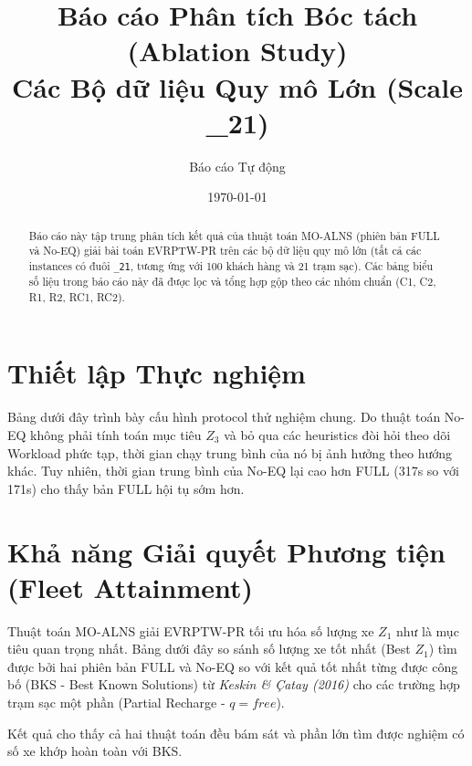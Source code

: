 \documentclass[12pt,a4paper]{article}
\title{Báo cáo Phân tích Bóc tách (Ablation Study)\\ Các Bộ dữ liệu Quy mô Lớn (Scale \_21)}
\author{Báo cáo Tự động}
\date{\today}
\begin{document}
\maketitle


\begin{abstract}
Báo cáo này tập trung phân tích kết quả của thuật toán MO-ALNS (phiên bản FULL và No-EQ) giải bài toán EVRPTW-PR trên các bộ dữ liệu quy mô lớn (tất cả các instances có đuôi \texttt{\_21}, tương ứng với 100 khách hàng và 21 trạm sạc). Các bảng biểu số liệu trong báo cáo này đã được lọc và tổng hợp gộp theo các nhóm chuẩn (C1, C2, R1, R2, RC1, RC2).
\end{abstract}

\section{Thiết lập Thực nghiệm}
Bảng dưới đây trình bày cấu hình protocol thử nghiệm chung. Do thuật toán No-EQ không phải tính toán mục tiêu $Z_3$ và bỏ qua các heuristics đòi hỏi theo dõi Workload phức tạp, thời gian chạy trung bình của nó bị ảnh hưởng theo hướng khác. Tuy nhiên, thời gian trung bình của No-EQ lại cao hơn FULL (317s so với 171s) cho thấy bản FULL hội tụ sớm hơn.

\begin{table}[H]
    \centering
    \caption{Protocol Thử nghiệm Tổng quan}
    
\end{table}

\section{Khả năng Giải quyết Phương tiện (Fleet Attainment)}
Thuật toán MO-ALNS giải EVRPTW-PR tối ưu hóa số lượng xe $Z_1$ như là mục tiêu quan trọng nhất. Bảng dưới đây so sánh số lượng xe tốt nhất (Best $Z_1$) tìm được bởi hai phiên bản FULL và No-EQ so với kết quả tốt nhất từng được công bố (BKS - Best Known Solutions) từ \textit{Keskin \& Çatay (2016)} cho các trường hợp trạm sạc một phần (Partial Recharge - $q=free$). 

Kết quả cho thấy cả hai thuật toán đều bám sát và phần lớn tìm được nghiệm có số xe khớp hoàn toàn với BKS.

\begin{table}[H]
    \centering
    \caption{So sánh Số lượng Xe (Best $Z_1$) với BKS (Keskin \& Çatay 2016)}
    
\end{table}
\end{document}

